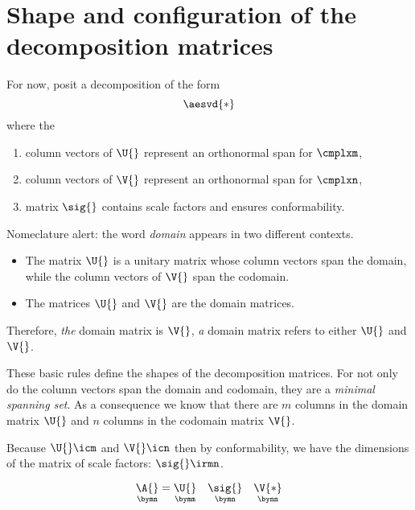 \section{Shape and configuration of the decomposition matrices}
For now, posit a decomposition of the form
%
\begin{equation}
  \aesvd{*}
  \label{eq:svd:genesis}
\end{equation}
%
where the
\begin{enumerate}
%
\item column vectors of $\U{}$ represent an orthonormal span for $\cmplxm$,
%
\item column vectors of $\V{}$ represent an orthonormal span for $\cmplxn$,
%
\item matrix $\sig{}$ contains scale factors and ensures conformability.
%
\end{enumerate}
Nomeclature alert: the word \emph{domain} appears in two different contexts.
\begin{itemize}
%
\item The matrix $\U{}$ is a unitary matrix whose column vectors span the domain, while the column vectors of $\V{}$ span the codomain.
%
\item The matrices $\U{}$ and $\V{}$ are the domain matrices.
%
\end{itemize}
Therefore, \emph{the} domain matrix is $\V{}$, \emph{a} domain matrix refers to either $\U{}$ and $\V{}$.

These basic rules define the shapes of the decomposition matrices. For not only do the column vectors span the domain and codomain, they are a \emph{minimal spanning set}. As a consequence we know that there are $m$ columns in the domain matrix $\U{}$ and $n$ columns in the codomain matrix $\V{}$.

Because $\U{}\icm$ and $\V{}\icn$ then by conformability, we have the dimensions of the matrix of scale factors: $\sig{}\irmn$.

%
\begin{equation}
  {\underset{\bymn} {\A{}} } = {\underset{\bymm} {\U{}} } \quad {\underset{\bymn} {\sig{}} } \quad {\underset{\bynn} {\V{*}} }
  \label{eq:svden:conform}
\end{equation}
%

\endinput